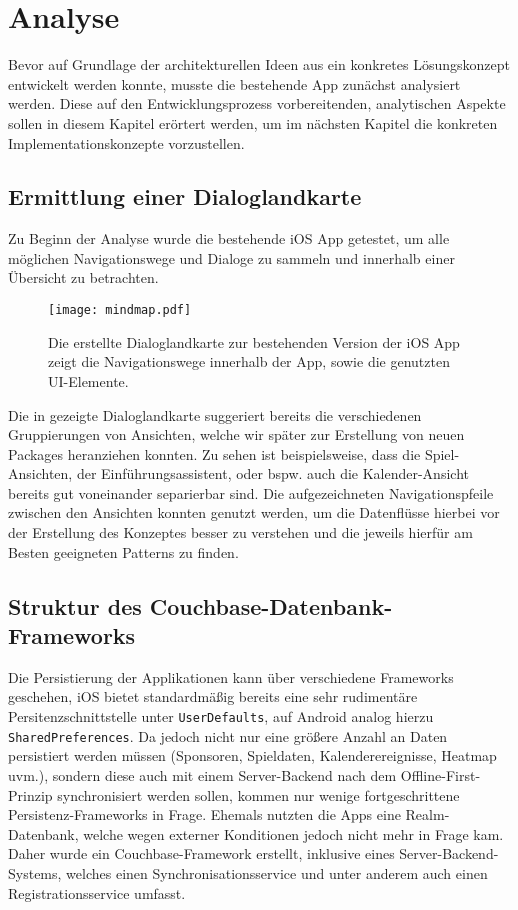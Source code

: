 \chapter{Analyse}\label{ch:analyse}

Bevor auf Grundlage der architekturellen Ideen aus  ein konkretes Lösungskonzept entwickelt werden konnte, musste die bestehende App zunächst analysiert werden. Diese auf den Entwicklungsprozess vorbereitenden, analytischen Aspekte sollen in diesem Kapitel erörtert werden, um im nächsten Kapitel die konkreten Implementationskonzepte vorzustellen.

\section{Ermittlung einer Dialoglandkarte}

Zu Beginn der Analyse wurde die bestehende iOS App getestet, um alle möglichen Navigationswege und Dialoge zu sammeln und innerhalb einer Übersicht zu betrachten.

\begin{figure}[H]
\texttt{[image: mindmap.pdf]}
\caption{Die erstellte Dialoglandkarte zur bestehenden Version der iOS App zeigt die Navigationswege innerhalb der App, sowie die genutzten UI-Elemente.}\label{fig:mindmap}
\end{figure}

Die in  gezeigte Dialoglandkarte suggeriert bereits die verschiedenen Gruppierungen von Ansichten, welche wir später zur Erstellung von neuen Packages heranziehen konnten. Zu sehen ist beispielsweise, dass die Spiel-Ansichten, der Einführungsassistent, oder bspw. auch die Kalender-Ansicht bereits gut voneinander separierbar sind. Die aufgezeichneten Navigationspfeile zwischen den Ansichten konnten genutzt werden, um die Datenflüsse hierbei vor der Erstellung des Konzeptes besser zu verstehen und die jeweils hierfür am Besten geeigneten Patterns zu finden.

\section{Struktur des Couchbase-Datenbank-Frameworks}

Die Persistierung der Applikationen kann über verschiedene Frameworks geschehen, iOS bietet standardmäßig bereits eine sehr rudimentäre Persitenzschnittstelle unter \texttt{UserDefaults}, auf Android analog hierzu \texttt{SharedPreferences}. Da jedoch nicht nur eine größere Anzahl an Daten persistiert werden müssen (Sponsoren, Spieldaten, Kalenderereignisse, Heatmap uvm.), sondern diese auch mit einem Server-Backend nach dem Offline-First-Prinzip synchronisiert werden sollen, kommen nur wenige fortgeschrittene Persistenz-Frameworks in Frage. Ehemals nutzten die Apps eine Realm-Datenbank, welche wegen externer Konditionen jedoch nicht mehr in Frage kam. Daher wurde ein Couchbase-Framework erstellt, inklusive eines Server-Backend-Systems, welches einen Synchronisationsservice und unter anderem auch einen Registrationsservice umfasst.

